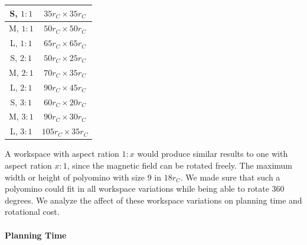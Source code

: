\begin{center}
	\begin{tabular}{|c|c|}
		\hline
		S, $ 1:1 $ & $35 r_C \times 35 r_C$\\
		\hline
		M, $ 1:1 $ & $50 r_C \times 50 r_C$ \\
		\hline
		L, $ 1:1 $ & $65 r_C \times 65 r_C$ \\
		\hline
		S, $ 2:1 $ & $50 r_C \times 25 r_C$\\
		\hline
		M, $ 2:1 $ & $70 r_C \times 35 r_C$ \\
		\hline
		L, $ 2:1 $ & $90 r_C \times 45 r_C$ \\
		\hline
		S, $ 3:1 $ & $60 r_C \times 20 r_C$\\
		\hline
		M, $ 3:1 $ & $90 r_C \times 30 r_C$ \\
		\hline
		L, $ 3:1 $ & $105 r_C \times 35 r_C$ \\
		\hline
	\end{tabular}
\end{center}

A workspace with aspect ration $ 1:x $ would produce similar results to one with aspect ration $ x:1 $, since the magnetic field can be rotated freely.
The maximum width or height of polyomino with size $9$ in $18 r_C$.
We made sure that such a polyomino could fit in all workspace variations while being able to rotate 360 degrees.
We analyze the affect of these workspace variations on planning time and rotational cost.

\paragraph{Planning Time} 

